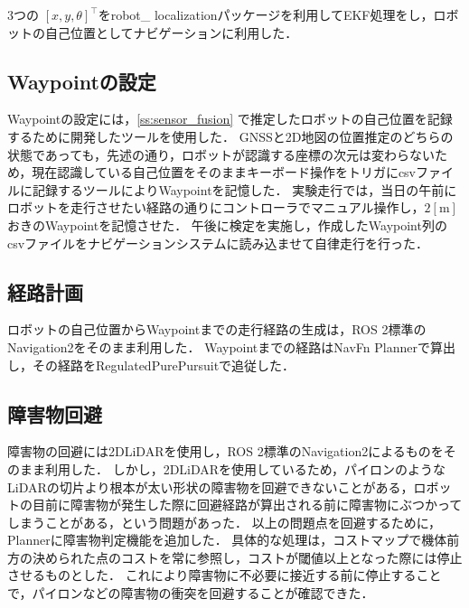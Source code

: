 \documentclass[platex,dvipdfmx]{rbproceedings}
\begin{document}
3つの $\left[ x, y, \theta \right] ^\top$をrobot\_ localization\cite{localization}パッケージを利用してEKF処理をし，ロボットの自己位置としてナビゲーションに利用した．

\subsection{Waypointの設定}
Waypointの設定には，\ref{ss:sensor_fusion} で推定したロボットの自己位置を記録するために開発したツールを使用した．
GNSSと2D地図の位置推定のどちらの状態であっても，先述の通り，ロボットが認識する座標の次元は変わらないため，現在認識している自己位置をそのままキーボード操作をトリガにcsvファイルに記録するツールによりWaypointを記憶した．
実験走行では，当日の午前にロボットを走行させたい経路の通りにコントローラでマニュアル操作し，$2[ \mathrm{m}]$おきのWaypointを記憶させた．
午後に検定を実施し，作成したWaypoint列のcsvファイルをナビゲーションシステムに読み込ませて自律走行を行った．

\subsection{経路計画}
ロボットの自己位置からWaypointまでの走行経路の生成は，ROS 2標準のNavigation2\cite{nav2}をそのまま利用した．
Waypointまでの経路はNavFn Planner\cite{navfn}で算出し，その経路をRegulatedPurePursuit\cite{rrp}で追従した．

\subsection{障害物回避} \label{ss:avoidance}
障害物の回避には2DLiDARを使用し，ROS 2標準のNavigation2によるものをそのまま利用した．
しかし，2DLiDARを使用しているため，パイロンのようなLiDARの切片より根本が太い形状の障害物を回避できないことがある，ロボットの目前に障害物が発生した際に回避経路が算出される前に障害物にぶつかってしまうことがある，という問題があった．
以上の問題点を回避するために，Plannerに障害物判定機能を追加した．
具体的な処理は，コストマップで機体前方の決められた点のコストを常に参照し，コストが閾値以上となった際には停止させるものとした．
これにより障害物に不必要に接近する前に停止することで，パイロンなどの障害物の衝突を回避することが確認できた．
\end{document}
